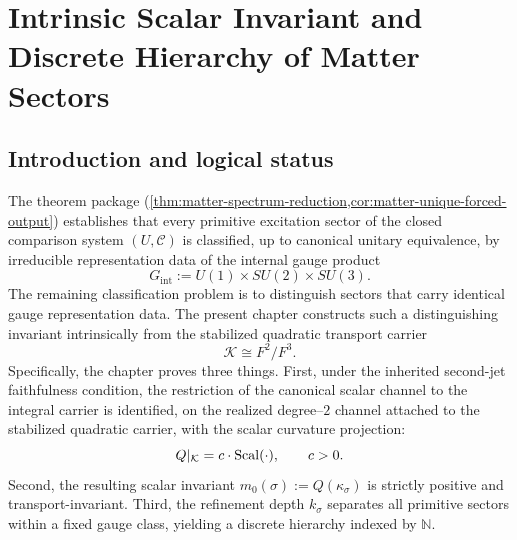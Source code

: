 \chapter{Intrinsic Scalar Invariant and Discrete Hierarchy of Matter Sectors}
\label{ch:matter-spectral}
\label{ch:matter}

\begin{chapterorientation}
\end{chapterorientation}
\section{Introduction and logical status}
\label{sec:spectral-intro}

The theorem package
(\cref{thm:matter-spectrum-reduction,cor:matter-unique-forced-output})
establishes that every primitive excitation sector of the closed
comparison system \((U,\mathcal C)\) is classified, up to canonical
unitary equivalence, by irreducible representation data of the internal
gauge product
\[
  G_{\mathrm{int}} := U(1)\times SU(2)\times SU(3).
\]
The remaining classification problem is to distinguish sectors that
carry identical gauge representation data.
The present chapter constructs such a distinguishing invariant
intrinsically from the stabilized quadratic transport carrier
\[
  \mathcal K \cong F^2/F^3.
\]
Specifically, the chapter proves three things.
First, under the inherited second-jet faithfulness condition, the
restriction of the canonical scalar channel to the integral carrier is
identified, on the realized degree--\(2\) channel attached to the
stabilized quadratic carrier, with the scalar curvature projection:
\[
  Q|_{\mathcal K} = c \cdot \operatorname{Scal}(\cdot),\qquad c > 0.
\]
Second, the resulting scalar invariant $m_0(\sigma) := Q(\kappa_\sigma)$
is strictly positive and transport-invariant.
Third, the refinement depth $k_\sigma$ separates all primitive sectors
within a fixed gauge class, yielding a discrete hierarchy indexed by
$\mathbb N$.

